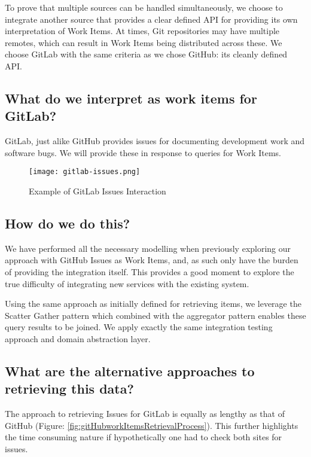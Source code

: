 To prove that multiple sources can be handled simultaneously, we choose to integrate another source that provides a clear defined API for providing its own interpretation of Work Items. At times, Git repositories may have multiple remotes, which can result in Work Items being distributed across these. We choose GitLab with the same criteria as we chose GitHub: its cleanly defined API.


\subsection{What do we interpret as work items for GitLab?}

GitLab, just alike GitHub provides issues for documenting development work and software bugs. We will provide these in response to queries for Work Items.

\begin{figure}[h!]
	\centering
	\texttt{[image: gitlab-issues.png]}
	\label{fig:gitlabIssuesExample}
	\caption{Example of GitLab Issues Interaction}
\end{figure}

\subsection{How do we do this?}

We have performed all the necessary modelling when previously exploring our approach with GitHub Issues as Work Items, and, as such only have the burden of providing the integration itself. This provides a good moment to explore the true difficulty of integrating new services with the existing system.

Using the same approach as initially defined for retrieving items, we leverage the Scatter Gather pattern which combined with the aggregator pattern enables these query results to be joined. We apply exactly the same integration testing approach and domain abstraction layer.

\subsection{What are the alternative approaches to retrieving this data?}

The approach to retrieving Issues for GitLab is equally as lengthy as that of GitHub (Figure: \ref{fig:gitHubworkItemsRetrievalProcess}). This further highlights the time consuming nature if hypothetically one had to check both sites for issues.

